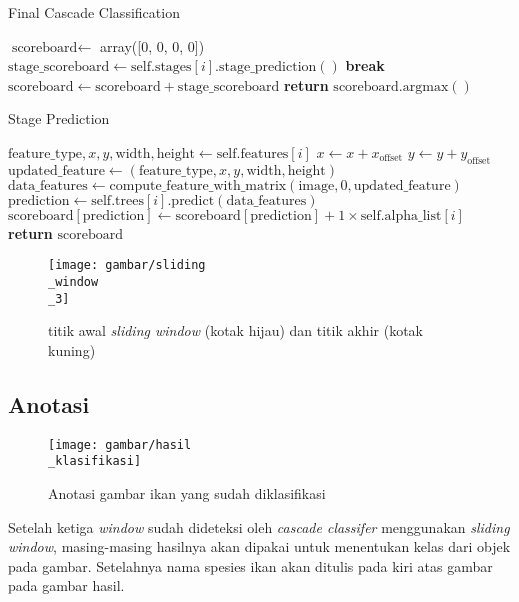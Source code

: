 \begin{algorithm}
  \caption{Final Cascade Classification}
  \begin{algorithmic}[1]
      \State $\text{scoreboard} \gets$ array([0, 0, 0, 0])
        \State $\text{stage\_scoreboard} \gets \text{self.stages}[i].\text{stage\_prediction}()$
         \textbf{break}
        \Else \State $\text{scoreboard} \gets \text{scoreboard} + \text{stage\_scoreboard}$ \EndIf
      \EndFor
      \State \textbf{return} $\text{scoreboard}.\text{argmax}()$
    \EndFunction
  \end{algorithmic}
\end{algorithm}

\begin{algorithm}
  \caption{Stage Prediction}
  \begin{algorithmic}[1]
        \State $\text{feature\_type}, x, y, \text{width}, \text{height} \gets \text{self.features}[i]$
        \State $x \gets x + x_{\text{offset}}$
        \State $y \gets y + y_{\text{offset}}$
        \State $\text{updated\_feature} \gets (\text{feature\_type}, x, y, \text{width}, \text{height})$
        \State $\text{data\_features} \gets \text{compute\_feature\_with\_matrix}(\text{image}, 0, \text{updated\_feature})$
        \State $\text{prediction} \gets \text{self.trees}[i].\text{predict}(\text{data\_features})$
        \State $\text{scoreboard}[\text{prediction}] \gets \text{scoreboard}[\text{prediction}] + 1 \times \text{self.alpha\_list}[i]$
      \EndFor
      \State \textbf{return} $\text{scoreboard}$
    \EndFunction
  \end{algorithmic}
\end{algorithm}

\begin{figure}[H]
  \centering{}
	\texttt{[image: gambar/sliding\\\_window\\\_3]}
  \caption{titik awal \textit{sliding window} (kotak hijau) dan titik akhir (kotak kuning)}
\end{figure}

\subsection{Anotasi}

\begin{figure}[H]
  \centering{}
	\texttt{[image: gambar/hasil\\\_klasifikasi]}
  \caption{Anotasi gambar ikan yang sudah diklasifikasi}
\end{figure}

Setelah ketiga \textit{window} sudah dideteksi oleh \emph{cascade classifer} 
menggunakan \textit{sliding window}, masing-masing hasilnya akan dipakai 
untuk menentukan kelas dari objek pada gambar. Setelahnya nama 
spesies ikan akan ditulis pada kiri atas gambar pada gambar hasil.


